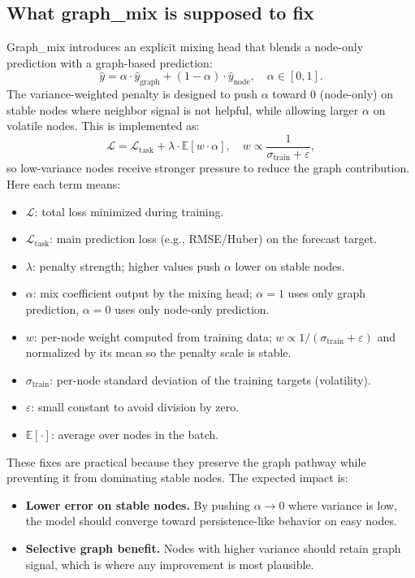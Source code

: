 \documentclass{article}
\begin{document}
\subsection{What graph\_mix is supposed to fix}
Graph\_mix introduces an explicit mixing head that blends a node-only prediction with a
graph-based prediction:
\[
\hat{y} = \alpha \cdot \hat{y}_{\text{graph}} + (1-\alpha) \cdot \hat{y}_{\text{node}},
\quad \alpha \in [0,1].
\]
The variance-weighted penalty is designed to push $\alpha$ toward $0$ (node-only) on stable nodes
where neighbor signal is not helpful, while allowing larger $\alpha$ on volatile nodes. This is implemented as:
\[
\mathcal{L} = \mathcal{L}_{\text{task}} + \lambda \cdot \mathbb{E}[w \cdot \alpha],
\quad w \propto \frac{1}{\sigma_{\text{train}}+\varepsilon},
\]
so low-variance nodes receive stronger pressure to reduce the graph contribution.
Here each term means:
\begin{itemize}
  \item $\mathcal{L}$: total loss minimized during training.
  \item $\mathcal{L}_{\text{task}}$: main prediction loss (e.g., RMSE/Huber) on the forecast target.
  \item $\lambda$: penalty strength; higher values push $\alpha$ lower on stable nodes.
  \item $\alpha$: mix coefficient output by the mixing head; $\alpha=1$ uses only graph prediction,
  $\alpha=0$ uses only node-only prediction.
  \item $w$: per-node weight computed from training data; $w \propto 1/(\sigma_{\text{train}}+\varepsilon)$ and
  normalized by its mean so the penalty scale is stable.
  \item $\sigma_{\text{train}}$: per-node standard deviation of the training targets (volatility).
  \item $\varepsilon$: small constant to avoid division by zero.
  \item $\mathbb{E}[\cdot]$: average over nodes in the batch.
\end{itemize}
These fixes are practical because they preserve the graph pathway while preventing it from
dominating stable nodes. The expected impact is:
\begin{itemize}
  \item \textbf{Lower error on stable nodes.} By pushing $\alpha \rightarrow 0$ where variance is
  low, the model should converge toward persistence-like behavior on easy nodes.
  \item \textbf{Selective graph benefit.} Nodes with higher variance should retain graph signal,
  which is where any improvement is most plausible.
\end{itemize}
\end{document}
